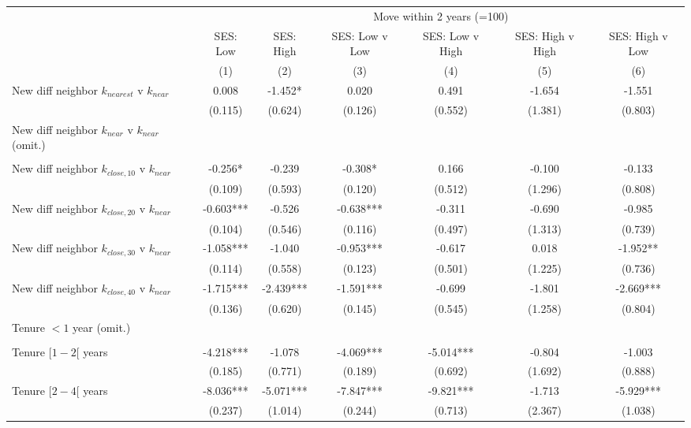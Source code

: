 \begin{tabular}{lcccccc}
\toprule
 & \multicolumn{6}{c}{Move within 2 years (=100)} \\ 
\cmidrule(lr){2-7}
 & SES: Low & SES: High & SES: Low v Low & SES: Low v High & SES: High v High & SES: High v Low \\ 
\cmidrule(lr){2-2} \cmidrule(lr){3-3} \cmidrule(lr){4-4} \cmidrule(lr){5-5} \cmidrule(lr){6-6} \cmidrule(lr){7-7}
  & (1) & (2) & (3) & (4) & (5) & (6) \\ 
\midrule
New diff neighbor $k_{nearest}$ v $k_{near}$ & 0.008 & -1.452* & 0.020 & 0.491 & -1.654 & -1.551 \\ 
 & (0.115) & (0.624) & (0.126) & (0.552) & (1.381) & (0.803) \\ 
New diff neighbor $k_{near}$ v $k_{near}$ (omit.) &  &  &  &  &  &  \\ 
 &    &    &    &    &    &    \\ 
New diff neighbor $k_{close,10}$ v $k_{near}$ & -0.256* & -0.239 & -0.308* & 0.166 & -0.100 & -0.133 \\ 
 & (0.109) & (0.593) & (0.120) & (0.512) & (1.296) & (0.808) \\ 
New diff neighbor $k_{close,20}$ v $k_{near}$ & -0.603*** & -0.526 & -0.638*** & -0.311 & -0.690 & -0.985 \\ 
 & (0.104) & (0.546) & (0.116) & (0.497) & (1.313) & (0.739) \\ 
New diff neighbor $k_{close,30}$ v $k_{near}$ & -1.058*** & -1.040 & -0.953*** & -0.617 & 0.018 & -1.952** \\ 
 & (0.114) & (0.558) & (0.123) & (0.501) & (1.225) & (0.736) \\ 
New diff neighbor $k_{close,40}$ v $k_{near}$ & -1.715*** & -2.439*** & -1.591*** & -0.699 & -1.801 & -2.669*** \\ 
 & (0.136) & (0.620) & (0.145) & (0.545) & (1.258) & (0.804) \\ 
 Tenure $<1$ year (omit.) &  & &  &  & &  \\ 
 & &  &  &  &  &  \\
Tenure $[1-2[$ years & -4.218*** & -1.078 & -4.069*** & -5.014*** & -0.804 & -1.003 \\ 
 & (0.185) & (0.771) & (0.189) & (0.692) & (1.692) & (0.888) \\ 
Tenure $[2-4[$ years & -8.036*** & -5.071*** & -7.847*** & -9.821*** & -1.713 & -5.929*** \\ 
 & (0.237) & (1.014) & (0.244) & (0.713) & (2.367) & (1.038) \\ 

\end{tabular}
